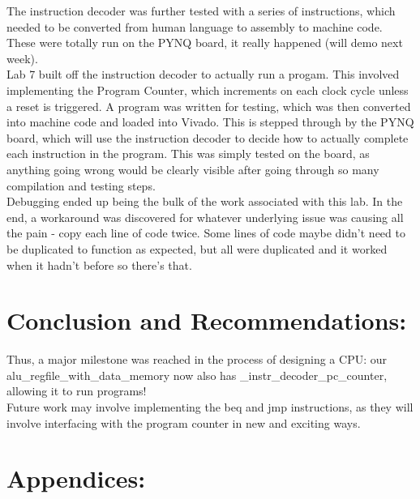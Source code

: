 \documentclass[12pt,a4paper]{article}
\begin{document}
The instruction decoder was further tested with a series of instructions, which
needed to be converted from human language to assembly to machine code. These
were totally run on the PYNQ board, it really happened (will demo next week). \\

Lab 7 built off the instruction decoder to actually run a progam. This involved
implementing the Program Counter, which increments on each clock cycle unless
a reset is triggered. A program was written for testing, which was then converted
into machine code and loaded into Vivado. This is stepped through by the PYNQ
board, which will use the instruction decoder to decide how to actually
complete each instruction in the program. This was simply tested on the board,
as anything going wrong would be clearly visible after going through so many
compilation and testing steps. \\

Debugging ended up being the bulk of the work associated with this lab. In the
end, a workaround was discovered for whatever underlying issue was causing
all the pain - copy each line of code twice. Some lines of code maybe didn't
need to be duplicated to function as expected, but all were duplicated and it
worked when it hadn't before so there's that. \\

\section*{Conclusion and Recommendations:}
Thus, a major milestone was reached in the process of designing a CPU: our
alu\_regfile\_with\_data\_memory now also has \_instr\_decoder\_pc\_counter,
allowing it to run programs! \\

Future work may involve implementing the beq and jmp instructions, as they
will involve interfacing with the program counter in new and exciting ways.

\newpage
\section*{Appendices:}
\end{document}
